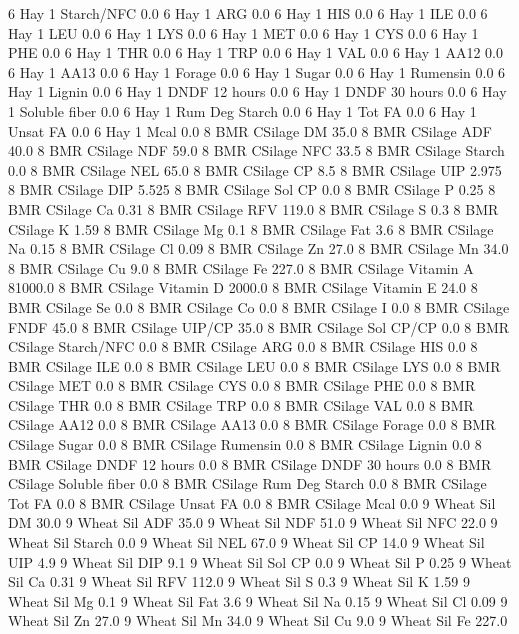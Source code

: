 \documentclass[letterpaper,10pt,english]{sphinxmanual}
\begin{document}
\begin{sphinxVerbatim}[commandchars=\\\{\},numbers=left,firstnumber=1,stepnumber=1]
6 Hay \PYGZsh{}1 Starch/NFC 0.0
6 Hay \PYGZsh{}1 ARG 0.0
6 Hay \PYGZsh{}1 HIS 0.0
6 Hay \PYGZsh{}1 ILE 0.0
6 Hay \PYGZsh{}1 LEU 0.0
6 Hay \PYGZsh{}1 LYS 0.0
6 Hay \PYGZsh{}1 MET 0.0
6 Hay \PYGZsh{}1 CYS 0.0
6 Hay \PYGZsh{}1 PHE 0.0
6 Hay \PYGZsh{}1 THR 0.0
6 Hay \PYGZsh{}1 TRP 0.0
6 Hay \PYGZsh{}1 VAL 0.0
6 Hay \PYGZsh{}1 AA\PYGZsh{}12 0.0
6 Hay \PYGZsh{}1 AA\PYGZsh{}13 0.0
6 Hay \PYGZsh{}1 \PYGZpc{} Forage 0.0
6 Hay \PYGZsh{}1 Sugar \PYGZpc{} 0.0
6 Hay \PYGZsh{}1 Rumensin 0.0
6 Hay \PYGZsh{}1 Lignin 0.0
6 Hay \PYGZsh{}1 DNDF 12 hours 0.0
6 Hay \PYGZsh{}1 DNDF 30 hours 0.0
6 Hay \PYGZsh{}1 Soluble fiber 0.0
6 Hay \PYGZsh{}1 Rum Deg Starch 0.0
6 Hay \PYGZsh{}1 Tot FA 0.0
6 Hay \PYGZsh{}1 Unsat FA 0.0
6 Hay \PYGZsh{}1 Mcal 0.0
8 BMR CSilage DM 35.0
8 BMR CSilage ADF 40.0
8 BMR CSilage NDF 59.0
8 BMR CSilage NFC 33.5
8 BMR CSilage Starch 0.0
8 BMR CSilage NEL 65.0
8 BMR CSilage CP 8.5
8 BMR CSilage UIP 2.975
8 BMR CSilage DIP 5.525
8 BMR CSilage Sol CP 0.0
8 BMR CSilage P 0.25
8 BMR CSilage Ca 0.31
8 BMR CSilage RFV 119.0
8 BMR CSilage S 0.3
8 BMR CSilage K 1.59
8 BMR CSilage Mg 0.1
8 BMR CSilage Fat 3.6
8 BMR CSilage Na 0.15
8 BMR CSilage Cl 0.09
8 BMR CSilage Zn 27.0
8 BMR CSilage Mn 34.0
8 BMR CSilage Cu 9.0
8 BMR CSilage Fe 227.0
8 BMR CSilage Vitamin A 81000.0
8 BMR CSilage Vitamin D 2000.0
8 BMR CSilage Vitamin E 24.0
8 BMR CSilage Se 0.0
8 BMR CSilage Co 0.0
8 BMR CSilage I 0.0
8 BMR CSilage FNDF 45.0
8 BMR CSilage UIP/CP 35.0
8 BMR CSilage Sol CP/CP 0.0
8 BMR CSilage Starch/NFC 0.0
8 BMR CSilage ARG 0.0
8 BMR CSilage HIS 0.0
8 BMR CSilage ILE 0.0
8 BMR CSilage LEU 0.0
8 BMR CSilage LYS 0.0
8 BMR CSilage MET 0.0
8 BMR CSilage CYS 0.0
8 BMR CSilage PHE 0.0
8 BMR CSilage THR 0.0
8 BMR CSilage TRP 0.0
8 BMR CSilage VAL 0.0
8 BMR CSilage AA\PYGZsh{}12 0.0
8 BMR CSilage AA\PYGZsh{}13 0.0
8 BMR CSilage \PYGZpc{} Forage 0.0
8 BMR CSilage Sugar \PYGZpc{} 0.0
8 BMR CSilage Rumensin 0.0
8 BMR CSilage Lignin 0.0
8 BMR CSilage DNDF 12 hours 0.0
8 BMR CSilage DNDF 30 hours 0.0
8 BMR CSilage Soluble fiber 0.0
8 BMR CSilage Rum Deg Starch 0.0
8 BMR CSilage Tot FA 0.0
8 BMR CSilage Unsat FA 0.0
8 BMR CSilage Mcal 0.0
9 Wheat Sil DM 30.0
9 Wheat Sil ADF 35.0
9 Wheat Sil NDF 51.0
9 Wheat Sil NFC 22.0
9 Wheat Sil Starch 0.0
9 Wheat Sil NEL 67.0
9 Wheat Sil CP 14.0
9 Wheat Sil UIP 4.9
9 Wheat Sil DIP 9.1
9 Wheat Sil Sol CP 0.0
9 Wheat Sil P 0.25
9 Wheat Sil Ca 0.31
9 Wheat Sil RFV 112.0
9 Wheat Sil S 0.3
9 Wheat Sil K 1.59
9 Wheat Sil Mg 0.1
9 Wheat Sil Fat 3.6
9 Wheat Sil Na 0.15
9 Wheat Sil Cl 0.09
9 Wheat Sil Zn 27.0
9 Wheat Sil Mn 34.0
9 Wheat Sil Cu 9.0
9 Wheat Sil Fe 227.0

\end{sphinxVerbatim}
\end{document}
